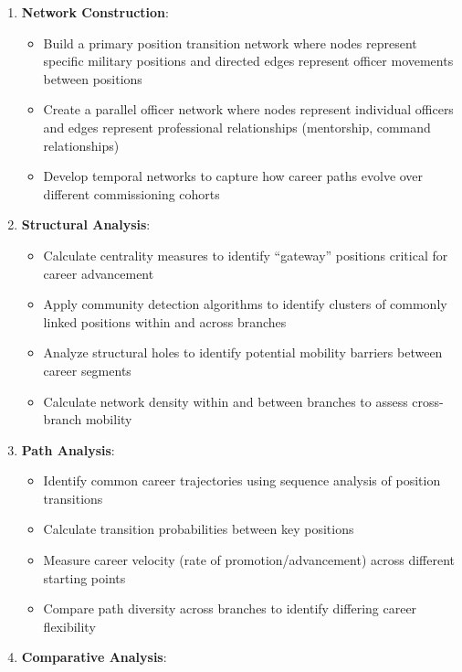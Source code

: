 \documentclass[
  letterpaper,
  DIV=11,
  numbers=noendperiod]{scrartcl}
\providecommand{\tightlist}{%
  \setlength{\itemsep}{0pt}\setlength{\parskip}{0pt}}
\begin{document}
\begin{enumerate}
\def\labelenumi{\arabic{enumi}.}
\tightlist
\item
  \textbf{Network Construction}:

  \begin{itemize}
  \tightlist
  \item
    Build a primary position transition network where nodes represent
    specific military positions and directed edges represent officer
    movements between positions
  \item
    Create a parallel officer network where nodes represent individual
    officers and edges represent professional relationships (mentorship,
    command relationships)
  \item
    Develop temporal networks to capture how career paths evolve over
    different commissioning cohorts
  \end{itemize}
\item
  \textbf{Structural Analysis}:

  \begin{itemize}
  \tightlist
  \item
    Calculate centrality measures to identify ``gateway'' positions
    critical for career advancement
  \item
    Apply community detection algorithms to identify clusters of
    commonly linked positions within and across branches
  \item
    Analyze structural holes to identify potential mobility barriers
    between career segments
  \item
    Calculate network density within and between branches to assess
    cross-branch mobility
  \end{itemize}
\item
  \textbf{Path Analysis}:

  \begin{itemize}
  \tightlist
  \item
    Identify common career trajectories using sequence analysis of
    position transitions
  \item
    Calculate transition probabilities between key positions
  \item
    Measure career velocity (rate of promotion/advancement) across
    different starting points
  \item
    Compare path diversity across branches to identify differing career
    flexibility
  \end{itemize}
\item
  \textbf{Comparative Analysis}:


\end{enumerate}
\end{document}
